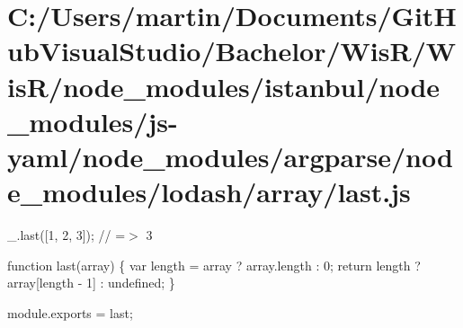 \hypertarget{_c_1_2_users_2martin_2_documents_2_git_hub_visual_studio_2_bachelor_2_wis_r_2_wis_r_2node_moduleeebccc0a732df170f45c01e0830cfbca}{}\section{C\+:/\+Users/martin/\+Documents/\+Git\+Hub\+Visual\+Studio/\+Bachelor/\+Wis\+R/\+Wis\+R/node\+\_\+modules/istanbul/node\+\_\+modules/js-\/yaml/node\+\_\+modules/argparse/node\+\_\+modules/lodash/array/last.\+js}
\+\_\+.\+last(\mbox{[}1, 2, 3\mbox{]}); // =$>$ 3


\begin{DoxyCodeInclude}

\textcolor{keyword}{function} last(array) \{
  var length = array ? array.length : 0;
  \textcolor{keywordflow}{return} length ? array[length - 1] : undefined;
\}

module.exports = last;
\end{DoxyCodeInclude}
 